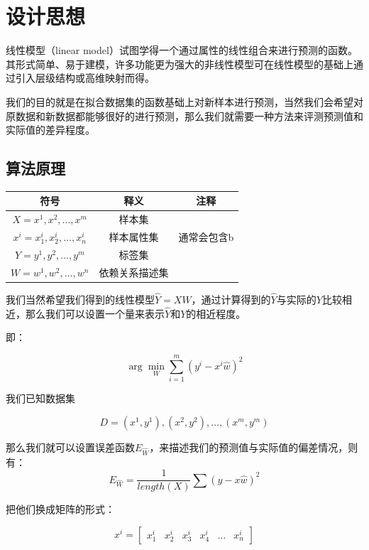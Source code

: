 \documentclass{ML}
\begin{document}
\section{设计思想}

线性模型（linear model）试图学得一个通过属性的线性组合来进行预测的函数。其形式简单、易于建模，许多功能更为强大的非线性模型可在线性模型的基础上通过引入层级结构或高维映射而得。

我们的目的就是在拟合数据集的函数基础上对新样本进行预测，当然我们会希望对原数据和新数据都能够很好的进行预测，那么我们就需要一种方法来评测预测值和实际值的差异程度。

\subsection{算法原理}

\begin{table}[H]
	\centering
	\begin{tabular}{ccc}
		\\ \hline
		符号                          & 释义           & 注释        \\ \hline
		\(X = x^{1},x^{2},…,x^{m}\)   & 样本集         &             \\
		\(x^i = x_1^i,x_2^i,…,x_n^i\) & 样本属性集     & 通常会包含b \\
		\(Y = y^{1},y^{2},…,y^{m}\)   & 标签集         &             \\
		\(W = w^{1},w^{2},…,w^{n}\)   & 依赖关系描述集 &
		\\ \hline
	\end{tabular}
\end{table}

我们当然希望我们得到的线性模型\(\hat{Y} = X \hat{W}\)，通过计算得到的\(\hat{Y}\)与实际的\(Y\)比较相近，那么我们可以设置一个量来表示\(\hat{Y}\)和\(Y\)的相近程度。

即：

\[\arg \min_W \sum^m_{i=1}(y^i - x^i\hat{w})^2\]

我们已知数据集

\[D = {(x^1,y^1),(x^2,y^2),…,(x^m,y^m)}\]

那么我们就可以设置误差函数\(E_{\hat{W}}\)，来描述我们的预测值与实际值的偏差情况，则有：
\[E_{\hat{W}} = \frac{1}{length(X)} ∑(y - x \hat{w})^2\]

把他们换成矩阵的形式：

\[x^i = \begin{bmatrix}
		x^i_1 & x^i_2 & x^i_3 & x^i_4 & … & x^i_n
	\end{bmatrix}\]
\end{document}
